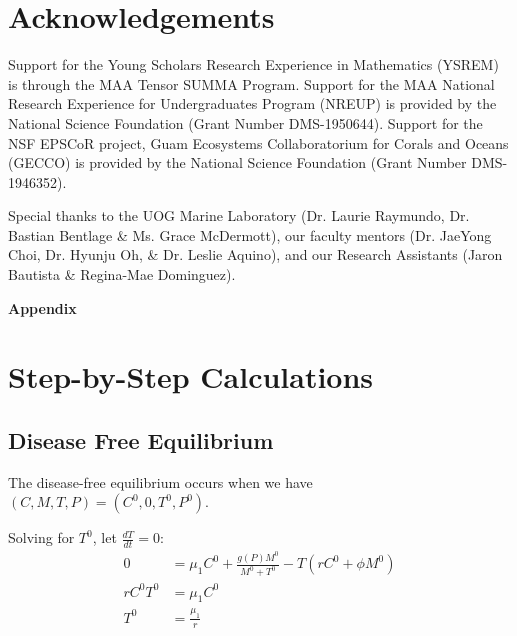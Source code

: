 \documentclass[12pt]{article}
\begin{document}

\section{Acknowledgements}
Support for the Young Scholars Research Experience in Mathematics (YSREM)  is through the MAA Tensor SUMMA Program. Support for the MAA National Research Experience for Undergraduates Program (NREUP) is provided by the National Science Foundation (Grant Number DMS-1950644). Support for the NSF EPSCoR project, Guam Ecosystems Collaboratorium for Corals and Oceans (GECCO) is provided by the National Science Foundation (Grant Number DMS-1946352). \par
Special thanks to the UOG Marine Laboratory (Dr. Laurie Raymundo, Dr. Bastian Bentlage \& Ms. Grace McDermott), our faculty mentors (Dr. JaeYong Choi, Dr. Hyunju Oh, \& Dr. Leslie Aquino), and our Research Assistants (Jaron Bautista \& Regina-Mae Dominguez).

\newpage
\appendix
    {\huge \textbf{Appendix}}
    \section{Step-by-Step Calculations}
    \subsection{Disease Free Equilibrium}
        \label{appendix:A1}
        The disease-free equilibrium occurs when we have $(C, M, T, P) = (C^{0}, 0, T^{0}, P^{0})$. 

        Solving for $T^{0}$, let $\frac{dT}{dt} = 0$: 
            \begin{align*}
                0 &= \mu_{1}C^{0} + \frac{g(P)M^{0}}{M^{0} + T^{0}} - T(rC^{0} + \phi M^{0}) \\
                rC^{0}T^{0} &= \mu_{1}C^{0} \\
                T^{0} &= \frac{\mu_{1}}{r} \\
            \end{align*}
            
\end{document}

